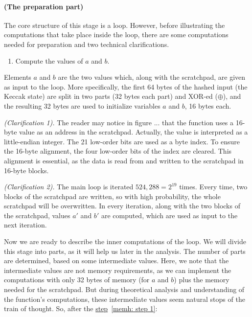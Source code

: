 \paragraph{(The preparation part)} The core structure of this stage is a loop. However, before illustrating the computations that take place inside the loop, there are some computations needed for preparation and two technical clarifications.

\begin{enumerate}
  \item \label{memh: step 1} Compute the values of $a$ and $b$.
\end{enumerate}
Elements $a$ and $b$ are the two values which, along with the scratchpad, are given as input to the loop. More specifically, the first 64 bytes of the hashed input (the Keccak state) are split in two parts (32 bytes each part) and XOR-ed ($\oplus$), and the resulting 32 bytes are used to initialize variables $a$ and $b$, 16 bytes each.

\noindent \emph{(Clarification 1).} The reader may notice in figure ... that the function uses a 16-byte value as an address in the scratchpad. Actually, the value is interpreted as a little-endian integer. The 21 low-order bits are used as a byte index. To ensure the 16-byte alignment, the four low-order bits of the index are cleared. This alignment is essential, as the data is read from and written to the scratchpad in 16-byte blocks.

\noindent \emph{(Clarification 2).} The main loop is iterated $524,288 = 2^{19}$ times. Every time, two blocks of the scratchpad are written, so with high probability, the whole scratchpad will be overwritten. In every iteration, along with the two blocks of the scratchpad, values $a'$ and $b'$ are computed, which are used as input to the next iteration.

Now we are ready to describe the inner computations of the loop. We will divide this stage into parts, as it will help us later in the analysis. The number of parts are determined, based on some intermediate values. Here, we note that the intermediate values are not memory requirements, as we can implement the computations with only 32 bytes of memory (for $a$ and $b$) plus the memory needed for the scratchpad. But during theoretical analysis and understanding of the function's computations, these intermediate values seem natural stops of the train of thought. So, after the \hyperref[memh: step 1]{step}~\ref{memh: step 1}:

